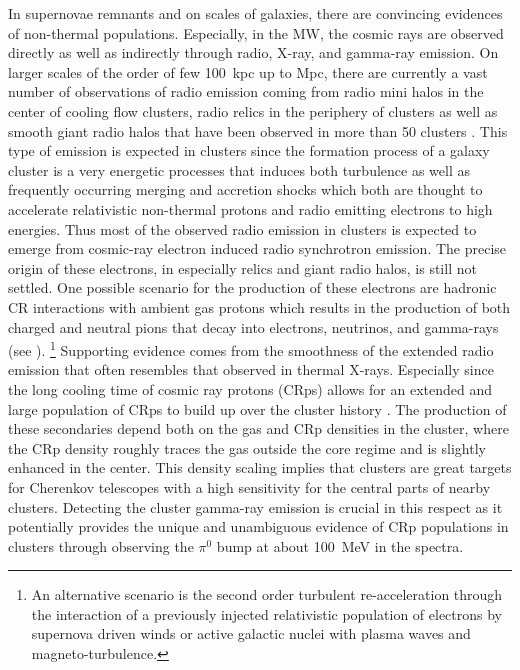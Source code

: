 \documentclass[10pt,aps,pra,reprint,amsmath,amsfonts,amssymb,showpacs,nofootinbib,floatfix]{revtex4-1}
\begin{document}
In supernovae remnants and on scales of galaxies, there are convincing
evidences of non-thermal populations. Especially, in the MW, the
cosmic rays are observed directly as well as indirectly through radio,
X-ray, and gamma-ray emission. On larger scales of the order of few
100~kpc up to Mpc, there are currently a vast number of observations
of radio emission coming from radio mini halos in the center of
cooling flow clusters, radio relics in the periphery of clusters
\cite{2004rcfg.proc..335K} as well as smooth giant radio halos that
have been observed in more than 50 clusters
\cite{2003ASPC..301..143F,2008SSRv..134...93F}. This type of emission
is expected in clusters since the formation process of a galaxy
cluster is a very energetic processes that induces both turbulence as
well as frequently occurring merging and accretion shocks which both
are thought to accelerate relativistic non-thermal protons and radio
emitting electrons to high energies. Thus most of the observed radio
emission in clusters is expected to emerge from cosmic-ray electron
induced radio synchrotron emission. The precise origin of these
electrons, in especially relics and giant radio halos, is still not
settled. One possible scenario for the production of these electrons
are hadronic CR interactions with ambient gas protons which results in
the production of both charged and neutral pions that decay into
electrons, neutrinos, and gamma-rays (see
\cite{1980ApJ...239L..93D,1982AJ.....87.1266V,1999APh....12..169B,2000A&A...362..151D,2001ApJ...559...59M,2003MNRAS.342.1009M,2004A&A...413...17P,2004MNRAS.352...76P,2008MNRAS.385.1211P,2008MNRAS.385.1242P,2009JCAP...09..024K,2010MNRAS.401...47D,2010MNRAS.407.1565D,2010ApJ...722..737K,2010arXiv1011.0729K,2011A&A...527A..99E}
). \footnote{An alternative scenario is the second order turbulent
  re-acceleration through the interaction of a previously injected
  relativistic population of electrons by supernova driven winds or
  active galactic nuclei with plasma waves and
  magneto-turbulence.\cite{1987A&A...182...21S,1993ApJ...406..399G,2004MNRAS.350.1174B,2005MNRAS.363.1173B,2007MNRAS.378..245B,2011MNRAS.410..127B,2009A&A...507..661B}}
Supporting evidence comes from the smoothness of the extended radio
emission that often resembles that observed in thermal
X-rays. Especially since the long cooling time of cosmic ray protons
(CRps) allows for an extended and large population of CRps to build up
over the cluster history \citep{1996SSRv...75..279V,
  1997ApJ...477..560E, 1997ApJ...487..529B}. The production of these
secondaries depend both on the gas and CRp densities in the cluster,
where the CRp density roughly traces the gas outside the core regime
and is slightly enhanced in the center.  This density scaling implies
that clusters are great targets for Cherenkov telescopes with a high
sensitivity for the central parts of nearby clusters. Detecting the
cluster gamma-ray emission is crucial in this respect as it
potentially provides the unique and unambiguous evidence of CRp
populations in clusters through observing the $\pi^0$ bump at about
100~MeV in the spectra.
\end{document}
